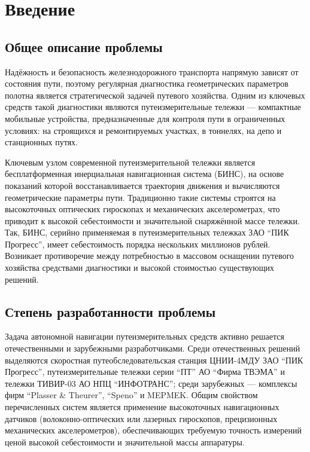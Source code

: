 \chapter*{Введение}

\section*{Общее описание проблемы}

Надёжность и безопасность железнодорожного транспорта напрямую зависят от состояния пути, поэтому регулярная диагностика геометрических параметров полотна является стратегической задачей путевого хозяйства. Одним из ключевых средств такой диагностики являются путеизмерительные тележки --- компактные мобильные устройства, предназначенные для контроля пути в ограниченных условиях: на строящихся и ремонтируемых участках, в тоннелях, на депо и станционных путях.

Ключевым узлом современной путеизмерительной тележки является бесплатформенная инерциальная навигационная система (БИНС), на основе показаний которой восстанавливается траектория движения и вычисляются геометрические параметры пути. Традиционно такие системы строятся на высокоточных оптических гироскопах и механических акселерометрах, что приводит к высокой себестоимости и значительной снаряжённой массе тележки. Так, БИНС, серийно применяемая в путеизмерительных тележках ЗАО \enquote{ПИК Прогресс}, имеет себестоимость порядка нескольких миллионов рублей. Возникает противоречие между потребностью в массовом оснащении путевого хозяйства средствами диагностики и высокой стоимостью существующих решений.

\section*{Степень разработанности проблемы}

Задача автономной навигации путеизмерительных средств активно решается отечественными и зарубежными разработчиками. Среди отечественных решений выделяются скоростная путеобследовательская станция ЦНИИ-4МДУ ЗАО \enquote{ПИК Прогресс}, путеизмерительные тележки серии \enquote{ПТ} АО \enquote{Фирма ТВЭМА} и тележки ТИВИР-03 АО НПЦ \enquote{ИНФОТРАНС}; среди зарубежных --- комплексы фирм \enquote{Plasser \& Theurer}, \enquote{Speno} и MEPMEK. Общим свойством перечисленных систем является применение высокоточных навигационных датчиков (волоконно-оптических или лазерных гироскопов, прецизионных механических акселерометров), обеспечивающих требуемую точность измерений ценой высокой себестоимости и значительной массы аппаратуры.

